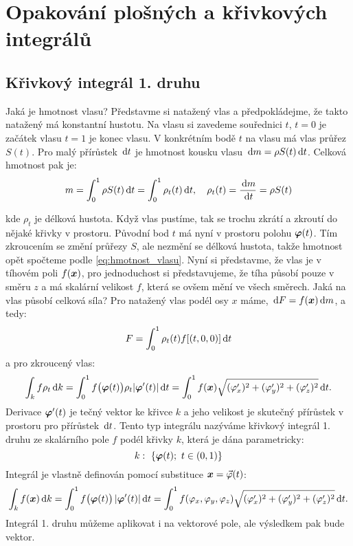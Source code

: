 \section{Opakování plošných a křivkových integrálů}

\subsection{Křivkový integrál 1. druhu}
Jaká je hmotnost vlasu? Představme si natažený vlas a předpokládejme, že takto natažený má konstantní hustotu. 
Na vlasu si zavedeme souřednici $t$, $t=0$ je začátek vlasu $t=1$ je konec vlasu.
V konkrétním bodě $t$ na vlasu má vlas průřez $S(t)$. Pro malý přírůstek $\,{\rm d} t$ je hmotnost kousku vlasu $\,{\rm d} m = \rho S(t)\,{\rm d} t$.
Celková hmotnost pak je:
\begin{equation}
    \label{eq:hmotnost_vlasu}    
    m=\int_0^1 \rho S(t) \,{\rm d} t = \int_0^1 \rho_t(t) \,{\rm d} t,\quad \rho_t(t) = \frac{\,{\rm d} m}{\,{\rm d} t}= \rho S(t)
\end{equation}


kde $\rho_t$ je délková hustota. Když vlas pustíme, tak se trochu zkrátí a zkroutí do nějaké křivky v prostoru. Původní bod $t$ má nyní v prostoru polohu 
$\mathbf{\boldsymbol{\varphi}}(t)$. Tím zkroucením se změní průřezy $S$, ale nezmění se délková hustota, takže hmotnost opět spočteme podle \ref{eq:hmotnost_vlasu}.
Nyní si představme, že vlas je v tíhovém poli $f(\mathbf{\boldsymbol{x}})$, pro jednoduchost si představujeme, že tíha působí pouze v směru $z$ a má skalární velikost $f$,
která se ovšem mění ve všech směrech. Jaká na vlas působí celková síla? Pro natažený vlas podél osy $x$ máme, $\,{\rm d} F = f(\mathbf{\boldsymbol{x}}) \,{\rm d} m$, a tedy:
\[
  F = \int_0^1 \rho_t(t) f[(t,0,0)] \,{\rm d} t
\]
a pro zkroucený vlas:
\[
   \int_k f \rho_t \,{\rm d} k = \int_0^1 f\big(\mathbf{\boldsymbol{\varphi}}(t)\big)\rho_t \lvert\mathbf{\boldsymbol{\varphi}}'(t)\rvert \,{\rm d}{t}=
   \int_0^1 f(\mathbf{\boldsymbol{x}}) \sqrt{ (\varphi_x')^2+(\varphi_y')^2+(\varphi_z')^2} \,{\rm d}{t}.
\]
Derivace $\mathbf{\boldsymbol{\varphi}}'(t)$ je tečný vektor ke křivce $k$ a jeho velikost je skutečný přírůstek v prostoru pro přírůstek $\,{\rm d} t$.
Tento typ integrálu nazýváme křivkový integrál 1. druhu ze skalárního pole $f$ podél křivky $k$, která je dána parametricky:
\[
   k:\ \{ \mathbf{\boldsymbol{\varphi}}(t);\ t\in (0,1)\}
\]
Integrál je vlastně definován pomocí substituce $\mathbf{\boldsymbol{x}} = \vec {\varphi}(t)$:
\begin{equation}
   \label{eq:curve_1_int}
   \int_k f(\mathbf{\boldsymbol{x}}) \,{\rm d} k = \int_0^1 f\big(\mathbf{\boldsymbol{\varphi}}(t)\big)\, \lvert\mathbf{\boldsymbol{\varphi}}'(t)\rvert \,{\rm d}{t}=
   \int_0^1 f(\varphi_x,\varphi_y,\varphi_z) \sqrt{ (\varphi_x')^2+(\varphi_y')^2+(\varphi_z')^2} \,{\rm d}{t}.
\end{equation}
Integrál 1. druhu můžeme aplikovat i na vektorové pole, ale výsledkem pak bude vektor. 

